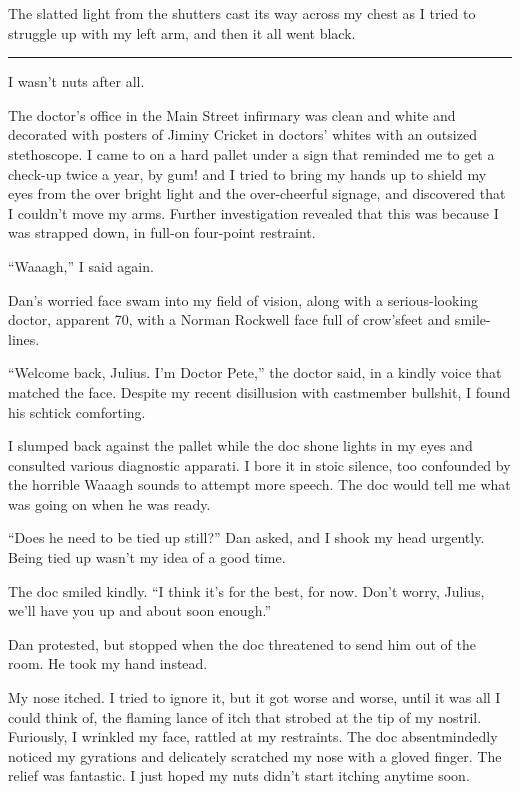 The slatted light from the shutters cast its way across my chest as
I tried to struggle up with my left arm, and then it all went
black.

\begin{center}\rule{3in}{0.4pt}\end{center}

I wasn't nuts after all.

The doctor's office in the Main Street infirmary was clean and
white and decorated with posters of Jiminy Cricket in doctors'
whites with an outsized stethoscope. I came to on a hard pallet
under a sign that reminded me to get a check-up twice a year, by
gum! and I tried to bring my hands up to shield my eyes from the
over bright light and the over-cheerful signage, and discovered
that I couldn't move my arms. Further investigation revealed that
this was because I was strapped down, in full-on four-point
restraint.

“Waaagh,” I said again.

Dan's worried face swam into my field of vision, along with a
serious-looking doctor, apparent 70, with a Norman Rockwell face
full of crow'sfeet and smile-lines.

“Welcome back, Julius. I'm Doctor Pete,” the doctor said, in a
kindly voice that matched the face. Despite my recent disillusion
with castmember bullshit, I found his schtick comforting.

I slumped back against the pallet while the doc shone lights in my
eyes and consulted various diagnostic apparati. I bore it in stoic
silence, too confounded by the horrible Waaagh sounds to attempt
more speech. The doc would tell me what was going on when he was
ready.

“Does he need to be tied up still?” Dan asked, and I shook my head
urgently. Being tied up wasn't my idea of a good time.

The doc smiled kindly. “I think it's for the best, for now. Don't
worry, Julius, we'll have you up and about soon enough.”

Dan protested, but stopped when the doc threatened to send him out
of the room. He took my hand instead.

My nose itched. I tried to ignore it, but it got worse and worse,
until it was all I could think of, the flaming lance of itch that
strobed at the tip of my nostril. Furiously, I wrinkled my face,
rattled at my restraints. The doc absentmindedly noticed my
gyrations and delicately scratched my nose with a gloved finger.
The relief was fantastic. I just hoped my nuts didn't start itching
anytime soon.

